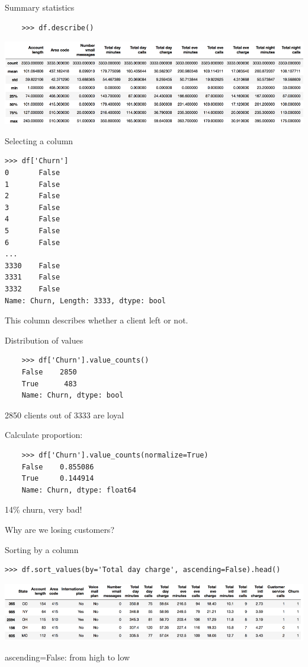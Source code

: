 \documentclass[aspectratio=169,usenames,dvipsnames]{beamer}
\begin{document}
\begin{frame}[fragile]{Summary statistics}
    \begin{lstlisting}
    >>> df.describe()
    \end{lstlisting}

    \includegraphics[height=0.5\textheight]{fig/telecomdescribe}
\end{frame}

\begin{frame}[fragile]{Selecting a column}
\begin{lstlisting}
>>> df['Churn']
0       False
1       False
2       False
3       False
4       False
5       False
6       False
...
3330    False
3331    False
3332    False
Name: Churn, Length: 3333, dtype: bool
\end{lstlisting}

This column describes whether a client left or not.
\end{frame}


\begin{frame}[fragile]{Distribution of values}
    \begin{lstlisting}
    >>> df['Churn'].value_counts()
    False    2850
    True      483
    Name: Churn, dtype: bool
    \end{lstlisting}

    2850 clients out of 3333 are loyal

    \vspace{1em}\pause
    Calculate proportion:
    \begin{lstlisting}
    >>> df['Churn'].value_counts(normalize=True)
    False    0.855086
    True     0.144914
    Name: Churn, dtype: float64
    \end{lstlisting}

    14\% churn, very bad!

    \vspace{1em}
    Why are we losing customers?

\end{frame}

\begin{frame}[fragile]{Sorting by a column}
\begin{lstlisting}
>>> df.sort_values(by='Total day charge', ascending=False).head()
\end{lstlisting}

    \includegraphics[height=0.3\textheight]{fig/telecomsort}

    ascending=False: from high to low
\end{frame}
\end{document}
